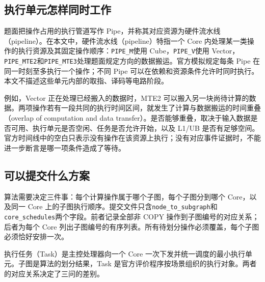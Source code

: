\documentclass[anonymous,notoc]{gmcm2026}
\begin{document}
\subsection{执行单元怎样同时工作}

题面把操作占用的执行管道写作 Pipe，并称其对应资源为硬件流水线（pipeline）。在本文中，硬件流水线（pipeline）特指一个 Core 内处理某一类操作的执行资源及其固定操作顺序：\texttt{PIPE\_M}使用 Cube，\texttt{PIPE\_V}使用 Vector，\texttt{PIPE\_MTE2}和\texttt{PIPE\_MTE3}处理题面规定方向的数据搬运。官方模拟规定每条 Pipe 在同一时刻至多执行一个操作；不同 Pipe 可以在依赖和资源条件允许时同时执行。本文不描述这些单元内部的取指、译码等电路阶段。

例如，Vector 正在处理已经搬入的数据时，MTE2 可以搬入另一块尚待计算的数据。两项操作若有一段共同的执行时间区间，就发生了计算与数据搬运的时间重叠（overlap of computation and data transfer）。是否能够重叠，取决于输入数据是否可用、执行单元是否空闲、任务是否允许开始，以及 L1/UB 是否有足够空间。官方时间线中的空白只表示没有操作在该资源上执行；没有对应事件证据时，不能进一步断言是哪一项条件造成了等待。

\subsection{可以提交什么方案}

算法需要决定三件事：每个计算操作属于哪个子图，每个子图分到哪个 Core，以及同一 Core 上的子图执行顺序。提交文件只含\texttt{node\_to\_subgraph}和\texttt{core\_schedules}两个字段。前者记录全部非 COPY 操作到子图编号的对应关系；后者为每个 Core 列出子图编号的有序列表。所有待划分操作必须覆盖，每个子图必须恰好安排一次。

执行任务（Task）是主控处理器向一个 Core 一次下发并统一调度的最小执行单元。子图是算法的划分结果，Task 是官方评价程序按场景组织的执行对象。两者的对应关系决定了三问的差别。
\end{document}
